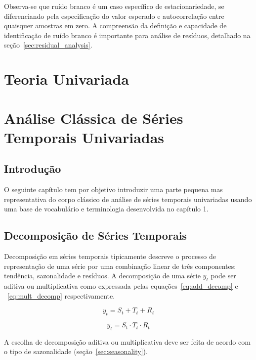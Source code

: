 Observa-se que ruído branco é um caso específico de estacionariedade, se
diferenciando pela especificação do valor esperado e autocorrelação entre
quaisquer amostras em zero. A compreensão da definição e capacidade de
identificação de ruído branco é importante para análise de resíduos, detalhado
na seção~\ref{sec:residual_analysis}.

\chapter{Teoria Univariada}
\label{chap:univariate_theory}

\chapter{Análise Clássica de Séries Temporais Univariadas}

\section*{Introdução}

O seguinte capítulo tem por objetivo introduzir uma parte pequena mas
representativa do corpo clássico de análise de séries temporais univariadas
usando uma base de vocabulário e terminologia desenvolvida no capítulo 1.

\section{Decomposição de Séries Temporais}
\label{sec:decomposition}

Decomposição em séries temporais tipicamente descreve o processo de
representação de uma série por uma combinação linear de três componentes:
tendência, sazonalidade e resíduos. A decomposição de uma série $y_t$ pode ser
aditiva ou multiplicativa como expressada pelas equações~\ref{eq:add_decomp} e
~\ref{eq:mult_decomp} respectivamente.

\begin{equation}\label{eq:add_decomp}
    y_t = S_t + T_t + R_t
\end{equation}

\begin{equation}\label{eq:mult_decomp}
    y_t = S_t \cdot T_t \cdot R_t
\end{equation}

A escolha de decomposição aditiva ou multiplicativa deve ser feita de acordo
com o tipo de sazonalidade (seção~\ref{sec:seasonality}).

